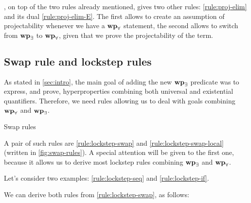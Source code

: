 , on top of the two rules already mentioned, gives two other rules: \cref{rule:proj-elim} and its dual \cref{rule:proj-elim-E}. The first allows to create an assumption of projectability whenever we have a $\wpsymb_{\forall}$ statement, the second allows to switch from $\wpsymb_{\exists}$ to $\wpsymb_{\forall}$, given that we prove the projectability of the term.

\subsection{Swap rule and lockstep rules}

As stated in \cref{sec:intro}, the main goal of adding the new $\wpsymb_{\exists}$ predicate was to express, and prove, hyperproperties combining both universal and existential quantifiers. Therefore, we need rules allowing us to deal with goals combining $\wpsymb_{\forall}$ and $\wpsymb_{\exists}$.

\begin{mathfig}{\small}
    \begin{proofrules}        
        
        \label{rule:lockstep-swap}

        
        \label{rule:lockstep-swap-local}
    \end{proofrules}
    \caption{Swap rules}
    \label{fig:swap-rules}
\end{mathfig}

A pair of such rules are \cref{rule:lockstep-swap} and \cref{rule:lockstep-swap-local} (written in \cref{fig:swap-rules}). A special attention will be given to the first one, because it allows us to derive most lockstep rules combining $\wpsymb_{\exists}$ and $\wpsymb_{\forall}$.

Let's consider two examples: \cref{rule:lockstep-seq} and \cref{rule:lockstep-if}.

\resizebox{0.8\width}{!}{
\begin{proofrules}
    
    \label{rule:lockstep-seq}

    
    \label{rule:lockstep-if}
\end{proofrules}
}

\bigskip

We can derive both rules from \cref{rule:lockstep-swap}, as follows:

\bigskip

\begin{prooftree}
\end{prooftree}

